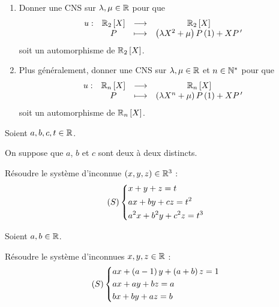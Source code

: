 \begin{corr}
\end{corr}

\begin{exo}[Exercice 3]
\begin{enumerate}
\item Donner une CNS sur \(\lambda,\mu\in\mathbb{R}\) pour que \[\fonction{u}{\polydeg[\R]{2}}{\polydeg[\R]{2}}{P}{\paren{\lambda X^2+\mu}P\paren{1}+XP\prim}\] soit un automorphisme de \(\polydeg[\R]{2}\). \\

\item Plus généralement, donner une CNS sur \(\lambda,\mu\in\mathbb{R}\) et \(n\in\mathbb{N}^*\) pour que \[\fonction{u}{\polydeg[\R]{n}}{\polydeg[\R]{n}}{P}{\paren{\lambda X^n+\mu}P\paren{1}+XP\prim}\] soit un automorphisme de \(\polydeg[\R]{n}\).
\end{enumerate}
\end{exo}

\begin{corr}
\end{corr}

\begin{exo}[Exercice 4]
Soient \(a,b,c,t\in\mathbb{R}\).

On suppose que \(a\), \(b\) et \(c\) sont deux à deux distincts.

Résoudre le système d'inconnue \(\left(x,y,z\right)\in\mathbb{R}^3\) : \[\left(S\right)\begin{dcases}
x+y+z=t \\
ax+by+cz=t^2 \\
a^2x+b^2y+c^2z=t^3
\end{dcases}\]
\end{exo}

\begin{corr}
\end{corr}

\begin{exo}[Exercice 5]
Soient \(a,b\in\mathbb{R}\).

Résoudre le système d'inconnues \(x,y,z\in\mathbb{R}\) : \[\left(S\right)\begin{dcases}
ax+\left(a-1\right)y+\left(a+b\right)z=1 \\
ax+ay+bz=a \\
bx+by+az=b
\end{dcases}\]
\end{exo}

\begin{corr}
\end{corr}

